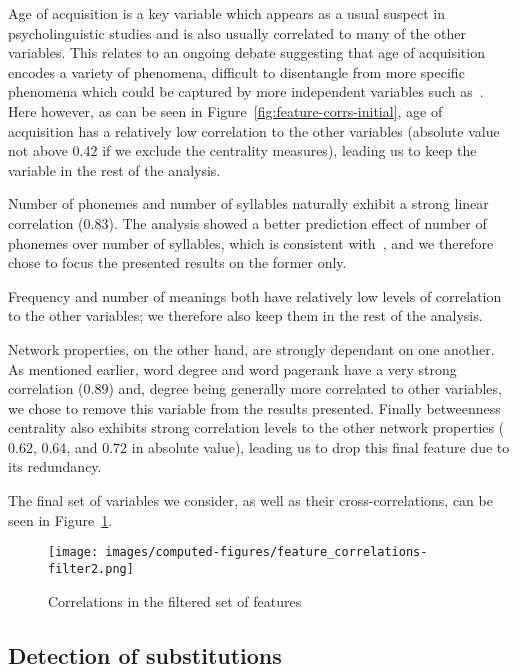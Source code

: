 Age of acquisition is a key variable which appears as a usual suspect in psycholinguistic studies and is also usually correlated to many of the other variables.
This relates to an ongoing debate suggesting that age of acquisition encodes a variety of phenomena, difficult to disentangle from more specific phenomena which could be captured by more independent variables such as~\CN{}.
Here however, as can be seen in Figure~\ref{fig:feature-corrs-initial}, age of acquisition has a relatively low correlation to the other variables (absolute value not above $0.42$ if we exclude the centrality measures), leading us to keep the variable in the rest of the analysis.

Number of phonemes and number of syllables naturally exhibit a strong linear correlation ($0.83$).
The analysis showed a better prediction effect of number of phonemes over number of syllables, which is consistent with~\citet{nick-diss}, and we therefore chose to focus the presented results on the former only.

Frequency and number of meanings both have relatively low levels of correlation to the other variables; we therefore also keep them in the rest of the analysis.

\bigskip
Network properties, on the other hand, are strongly dependant on one another.
As mentioned earlier, word degree and word pagerank have a very strong correlation ($0.89$) and, degree being generally more correlated to other variables, we chose to remove this variable from the results presented.
Finally betweenness centrality also exhibits strong correlation levels to the other network properties ($0.62$, $0.64$, and $0.72$ in absolute value), leading us to drop this final feature due to its redundancy.

The final set of variables we consider, as well as their cross-correlations, can be seen in Figure~\ref{fig:feature-corrs-filtered}.

\begin{figure}[!th]
    \centering
    \texttt{[image: images/computed-figures/feature\_correlations-filter2.png]}
    \caption{Correlations in the filtered set of features }
    \label{fig:feature-corrs-filtered}
\end{figure}


\subsection{Detection of substitutions}

